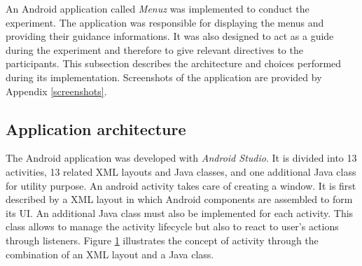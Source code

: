 An Android application called \textit{Menuz} was implemented to conduct the 
experiment. The application was responsible for displaying the menus and 
providing their guidance informations. It was also designed to act as a guide 
during the experiment and therefore to give relevant directives to the 
participants. This subsection describes the architecture and choices performed 
during its implementation. Screenshots of the application are provided by 
Appendix \ref{screenshots}.

\subsection{Application architecture}

The Android application was developed with \textit{Android Studio}. It is 
divided into 13 activities, 13 related XML layouts and Java classes, and one 
additional Java class for utility purpose. An android activity takes care of 
creating a window. It is first described by a XML layout in which Android 
components are assembled to form its UI. An additional Java class must also be 
implemented for each activity. This class allows to manage the activity 
lifecycle but also to react to user’s actions through listeners. Figure 
\ref{fig:activity} illustrates the concept of activity through the combination 
of an XML layout and a Java class.\newline

\begin{figure}[!ht]
    
    \label{fig:activity}
\end{figure}

